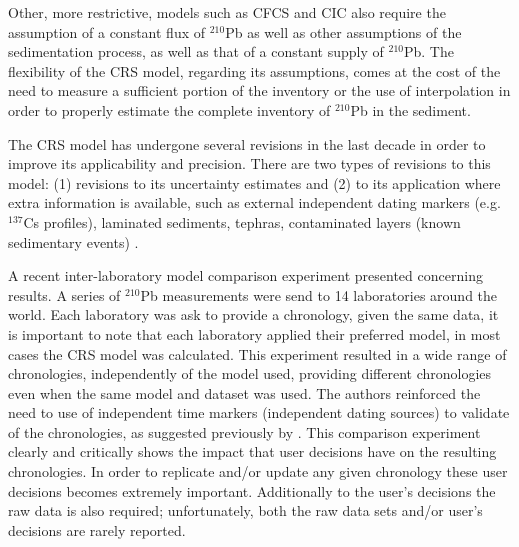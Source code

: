 \documentclass [10pt] {article}
\begin{document}
Other, more restrictive, models such as CFCS and CIC also require the assumption of a constant flux of $^{210}$Pb as well as other assumptions of the sedimentation process, as well as that of a constant supply of $^{210}$Pb.
The flexibility of the CRS model, regarding its assumptions, comes at the cost of the need to measure a sufficient portion of the inventory or the use of interpolation in order to properly estimate the complete inventory of $^{210}$Pb in the sediment. 

The CRS model has undergone several revisions in the last decade in order to improve its applicability and precision. 
There are two types of revisions to this model: (1) revisions to its uncertainty estimates \citep[eg. ][]{Binford1990,Appleby2001,Sanchez-Cabeza2014} and (2) to its application where extra information is available, such as external independent dating markers (e.g. $^{137}$Cs profiles), laminated sediments, tephras, contaminated layers (known sedimentary events) \citep[eg.][]{Appleby1998,Appleby2001,Appleby2008}. 

A recent inter-laboratory model comparison experiment \citep{Barsanti2020} presented concerning results.
A series of $^{210}$Pb measurements were send to 14 laboratories around the world.
Each laboratory was ask to provide a chronology, given the same data, it is important to note that each laboratory applied their preferred model, in most cases the CRS model was calculated.
This experiment resulted in a wide range of chronologies, independently of the model used, providing different chronologies even when the same model and dataset was used.
The authors reinforced the need to use of independent time markers (independent dating sources) to validate of the chronologies, as suggested previously by \citep{Smith2001}.  
This comparison experiment clearly and critically shows the impact that user decisions have on the resulting chronologies.
In order to replicate and/or update any given chronology these user decisions becomes extremely important.
Additionally to the user's decisions the raw data is also required; unfortunately, both the raw data sets and/or user's decisions are rarely reported.
\end{document}
